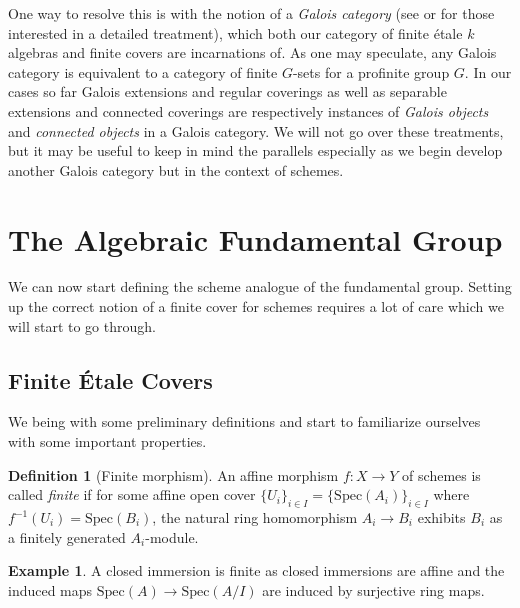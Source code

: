 \documentclass{article}
\theoremstyle{definition}
\newtheorem{definition}[theorem]{Definition}
\newtheorem{example}[theorem]{Example}
\theoremstyle{remark}
\theoremstyle{plain}
\begin{document}
One way to resolve this is with the notion of a \textit{Galois category} (see \cite{grothendieck} or \cite{Lenstra} for those interested in a detailed treatment), which both our category of finite \'etale $k$ algebras and finite covers are incarnations of. 
As one may speculate, any Galois category is equivalent to a category of finite $G$-sets for a profinite group $G$.
In our cases so far Galois extensions and regular coverings as well as separable extensions and connected coverings are respectively instances of \textit{Galois objects} and \textit{connected objects} in a Galois category.
We will not go over these treatments, but it may be useful to keep in mind the parallels especially as we begin develop another Galois category but in the context of schemes.

\section{The Algebraic Fundamental Group}

We can now start defining the scheme analogue of the fundamental group.
Setting up the correct notion of a finite cover for schemes requires a lot of care which we will start to go through.

\subsection{Finite \'Etale Covers}

We being with some preliminary definitions and start to familiarize ourselves with some important properties.

\begin{definition}[Finite morphism]
	An affine morphism $f: X \to Y$ of schemes is called \textit{finite} if for some affine open cover $\{U_i\}_{i \in I}  = \{\text{Spec}(A_i)\}_{i \in I}$ where $f^{-1}(U_i) = \text{Spec}(B_i)$, the natural ring homomorphism $A_i \to B_i$ exhibits $B_i$ as a finitely generated $A_i$-module.
\end{definition}

\begin{example}
	A closed immersion is finite as closed immersions are affine and the induced maps $\text{Spec}(A) \to \text{Spec}(A/I)$ are induced by surjective ring maps.
\end{example}
\end{document}
